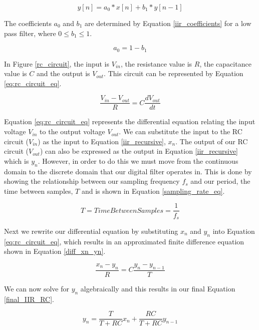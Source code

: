 \begin{equation}\label{iir_recursive}
y[n] = a_0 * x[n] + b_1 * y[n-1]
\end{equation}

The coefficients $a_0$ and $b_1$ are determined by Equation \ref{iir_coefficients} for a low pass filter, where $0 \leq b_1 \leq 1$.

\begin{equation}\label{iir_coefficients}
a_0 = 1 - b_1
\end{equation}

In Figure \ref{rc_circuit}, the input is $V_{in}$, the resistance value is $R$, the capacitance value is $C$ and the output is $V_{out}$.  This circuit can be represented by Equation \ref{eq:rc_circuit_eq}.

\begin{equation}\label{eq:rc_circuit_eq}
\frac{V_{in}-V_{out}}{R}=C\frac{dV_{out}}{dt}
\end{equation}

Equation \ref{eq:rc_circuit_eq} represents the differential equation relating the input voltage $V_{in}$ to the output voltage $V_{out}$.  We can substitute the input to the RC circuit ($V_{in}$) as the input to Equation \ref{iir_recursive}, $x_n$.  The output of our RC circuit ($V_{out}$) can also be expressed as the output in Equation \ref{iir_recursive} which is $y_n$.  However, in order to do this we must move from the continuous domain to the discrete domain that our digital filter operates in.  This is done by showing the relationship between our sampling frequency $f_s$ and our period, the time between samples, $T$ and is shown in Equation \ref{sampling_rate_eq}.

\begin{equation}\label{sampling_rate_eq}
T=Time Between Samples=\frac{1}{f_s}
\end{equation}

Next we rewrite our differential equation by substituting $x_n$ and $y_n$ into Equation \ref{eq:rc_circuit_eq}, which results in an approximated finite difference equation shown in Equation \ref{diff_xn_yn}.

\begin{equation}\label{diff_xn_yn}
\frac{x_n-y_n}{R}=C\frac{y_n-y_{n-1}}{T}
\end{equation}

We can now solve for $y_n$ algebraically and this results in our final Equation \ref{final_IIR_RC}.

\begin{equation}\label{final_IIR_RC}
y_n=\frac{T}{T+RC}x_n+\frac{RC}{T+RC}y_{n-1}
\end{equation}

